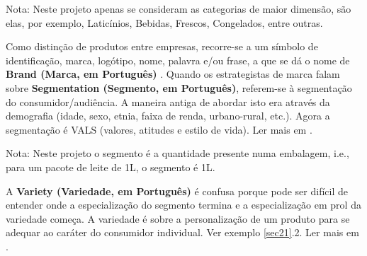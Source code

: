 {\footnotesize Nota: Neste projeto apenas se consideram as categorias de maior dimensão, são elas, por exemplo, Laticínios, Bebidas, Frescos, Congelados, entre outras.}

Como distinção de produtos entre empresas, recorre-se a um símbolo de identificação, marca, logótipo, nome, palavra e/ou frase, a que se dá o nome de \textbf{Brand (Marca, em Português)} \cite{investopedia:brandDefinition2018}.
Quando os estrategistas de marca falam sobre \textbf{Segmentation (Segmento, em Português)}, referem-se à segmentação do consumidor/audiência. A maneira antiga de abordar isto era através da demografia (idade, sexo, etnia, faixa de renda, urbano-rural, etc.). Agora a segmentação é VALS (valores, atitudes e estilo de vida). Ler mais em \cite{sphereoi:itemIdentification2018}.

{\footnotesize Nota: Neste projeto o segmento é a quantidade presente numa embalagem, i.e., para um pacote de leite de 1L, o segmento é 1L.}

A \textbf{Variety (Variedade, em Português)} é confusa porque pode ser difícil de entender onde a especialização do segmento termina e a especialização em prol da variedade começa. A variedade é sobre a personalização de um produto para se adequar ao caráter do consumidor individual. Ver exemplo \ref{sec21}.2. Ler mais em \cite{sphereoi:itemIdentification2018}.\\[0.25cm]

\noindent{}


